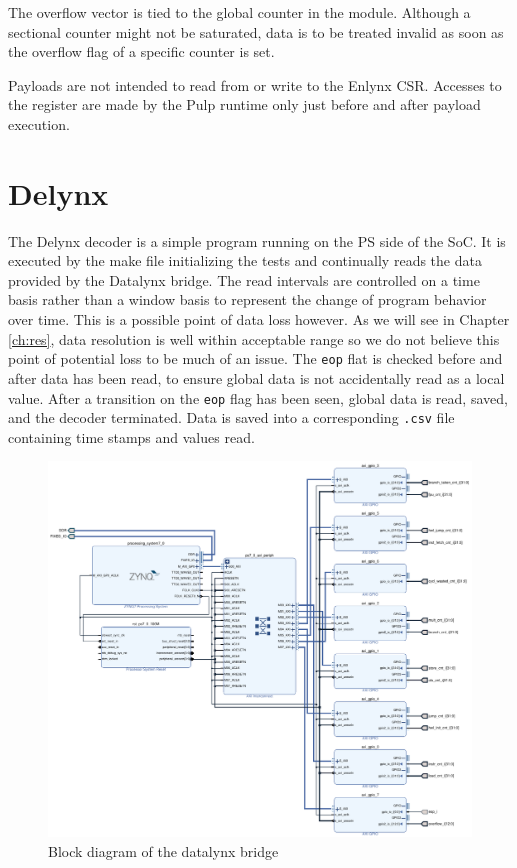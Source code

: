 \documentclass[../bachelor_paper.tex]{subfiles}
\begin{document}
The overflow vector is tied to the global counter in the module. Although a sectional counter might not be saturated, data is to be treated invalid as soon as the overflow flag of a specific counter is set.

Payloads are not intended to read from or write to the Enlynx \ac{CSR}. Accesses to the register are made by the Pulp runtime only just before and after payload execution.

\section{Delynx}
The Delynx decoder is a simple program running on the \ac{PS} side of the \ac{SoC}. It is executed by the make file initializing the tests and continually reads the data provided by the Datalynx bridge. The read intervals are controlled on a time basis rather than a window basis to represent the change of program behavior over time. This is a possible point of data loss however. As we will see in Chapter \ref{ch:res}, data resolution is well within acceptable range so we do not believe this point of potential loss to be much of an issue. The \texttt{eop} flat is checked before and after data has been read, to ensure global data is not accidentally read as a local value. After a transition on the \texttt{eop} flag has been seen, global data is read, saved, and the decoder terminated. Data is saved into a corresponding \texttt{.csv} file containing time stamps and values read.

\begin{figure}
    \centering
    \includegraphics[width=\textwidth]{img/datalynx_bd.pdf}
    \caption{Block diagram of the datalynx bridge}
    \label{fig:arch/comm/block}
\end{figure}

\isstandalone



\fi
\end{document}
